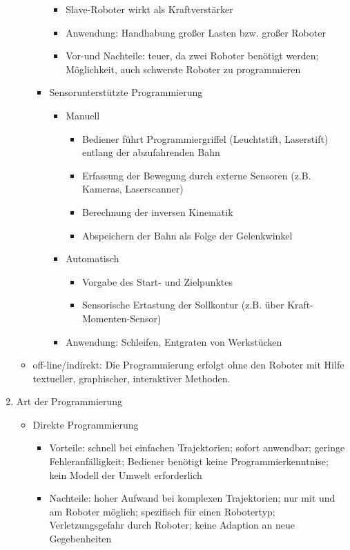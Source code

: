 \documentclass[paper=a4, fontsize=11pt]{scrartcl} %
\numberwithin{equation}{section} %
\numberwithin{figure}{section} %
\numberwithin{table}{section} %
\begin{document}
\begin{enumerate}
\begin{itemize}
\begin{itemize}
\begin{itemize}
\item Slave-Roboter wirkt als Kraftverstärker
\item Anwendung: Handhabung großer Lasten bzw. großer Roboter
\item Vor-und Nachteile: teuer, da zwei Roboter benötigt werden; Möglichkeit, auch schwerste Roboter zu programmieren
\end{itemize}
\item Sensorunterstützte Programmierung
\begin{itemize}
\item Manuell
\begin{itemize}
\item Bediener führt Programmiergriffel (Leuchtstift, Laserstift) entlang der abzufahrenden Bahn
\item Erfassung der Bewegung durch externe Sensoren (z.B. Kameras, Laserscanner)
\item Berechnung der inversen Kinematik
\item Abspeichern der Bahn als Folge der Gelenkwinkel
\end{itemize}
\item Automatisch
\begin{itemize}
\item Vorgabe des Start- und Zielpunktes
\item Sensorische Ertastung der Sollkontur (z.B. über Kraft-Momenten-Sensor)
\end{itemize}
\item Anwendung: Schleifen, Entgraten von Werkstücken
\end{itemize}
\end{itemize}
\item off-line/indirekt: Die Programmierung erfolgt ohne den Roboter mit Hilfe textueller, graphischer, interaktiver Methoden.
\end{itemize}
\item Art der Programmierung
\begin{itemize}
\item Direkte Programmierung
\begin{itemize}
\item Vorteile: schnell bei einfachen Trajektorien; sofort anwendbar; geringe Fehleranfälligkeit; Bediener benötigt keine Programmierkenntnise; kein Modell der Umwelt erforderlich
\item Nachteile: hoher Aufwand bei komplexen Trajektorien; nur mit und am Roboter möglich; spezifisch für einen Robotertyp; Verletzungsgefahr durch Roboter; keine Adaption an neue Gegebenheiten

\end{itemize}
\end{itemize}
\end{enumerate}
\end{document}
